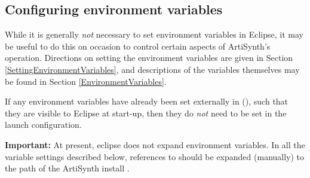 %
%
%

\subsection{Configuring environment variables}
\label{EclipseEnvironmentVariables}

While it is generally {\it not} necessary to set environment variables
in Eclipse, it may be useful to do this on occasion to control certain
aspects of ArtiSynth's operation.  Directions on setting the
environment variables are given in
Section \ref{SettingEnvironmentVariables}, and descriptions of the
variables themselves may be found in
Section \ref{EnvironmentVariables}.

If any environment variables have already been set externally in
\SYSTEM{} (\environmentSectionRef), such that they are visible
to Eclipse at start-up, then they do {\it not} need to be set in the
launch configuration.

\ifNeedLibraryPath

\begin{sideblock}
{\bf Important:} At present, eclipse does not expand environment variables.
In all the variable settings described below, references to 
\ArtHome[]should be expanded (manually) to the path of the
ArtiSynth install \directory{}.
\end{sideblock}

